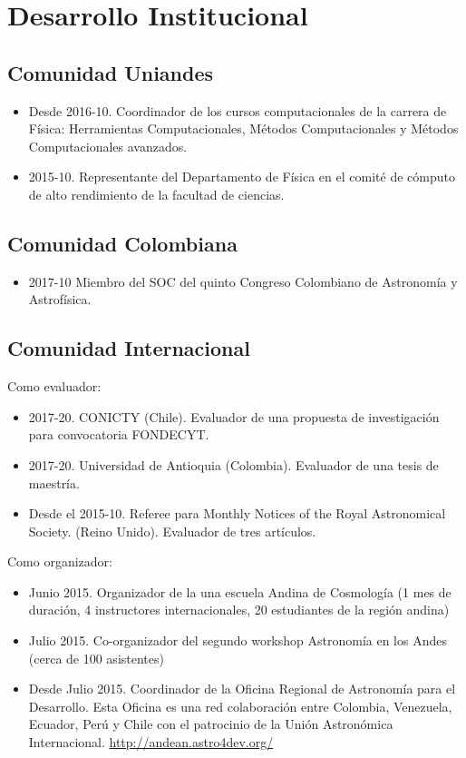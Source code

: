 \documentclass{article}
\begin{document}
\newpage
\section{Desarrollo Institucional}


\subsection{Comunidad Uniandes}
\begin{itemize}
\item {Desde 2016-10. Coordinador de los cursos computacionales de la carrera de
  F\'isica: Herramientas Computacionales, M\'etodos Computacionales y
  M\'etodos Computacionales avanzados.} 
\item {2015-10. Representante del Departamento de F\'isica en el comit\'e
  de c\'omputo de alto rendimiento de la facultad de ciencias.}
\end{itemize}


\subsection{Comunidad Colombiana}

\begin{itemize}
\item {2017-10} Miembro del SOC del quinto Congreso Colombiano de Astronom\'ia y
  Astrof\'isica.
\end{itemize}


\subsection{Comunidad Internacional}

Como evaluador:
\begin{itemize}
\item 2017-20. CONICTY (Chile). Evaluador de una propuesta de
  investigaci\'on para convocatoria FONDECYT.
\item 2017-20. Universidad de Antioquia (Colombia). Evaluador de una tesis de
  maestr\'ia.  
\item Desde el 2015-10. Referee para Monthly Notices of the Royal
  Astronomical Society. (Reino Unido). Evaluador de tres art\'iculos.
\end{itemize}


Como organizador:
\begin{itemize}
\item {Junio 2015. Organizador de la una escuela Andina de Cosmolog\'ia (1 mes de
  duraci\'on, 4 instructores internacionales, 20 estudiantes de la
  regi\'on andina)}
\item {Julio 2015. Co-organizador del segundo workshop Astronom\'ia en los Andes
  (cerca de 100 asistentes)}
\item {Desde Julio 2015. Coordinador de la Oficina Regional de
  Astronom\'ia para el Desarrollo. Esta Oficina es una red
  colaboraci\'on entre Colombia, Venezuela, Ecuador, Per\'u y Chile
  con el patrocinio de la Uni\'on Astron\'omica Internacional. 
\url{http://andean.astro4dev.org/}}    
\end{itemize}
\end{document}
